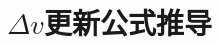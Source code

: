 \documentclass[11pt]{report}
\begin{document}
\section{$\Delta v$更新公式推导}


































 
\end{document}
